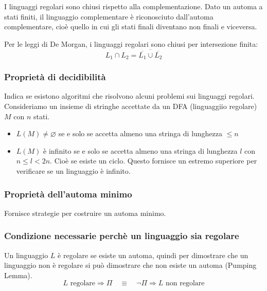\documentclass[a4paper]{article}
\begin{document}
\begin{theorem}
  I linguaggi regolari sono chiusi rispetto alla complementazione. Dato un automa
  a stati finiti, il linguaggio complementare è riconosciuto dall'automa complementare,
  cioè quello in cui gli stati finali diventano non finali e viceversa.

  \vspace{1em}
  \noindent
  Per le leggi di De Morgan, i linguaggi regolari sono chiusi per intersezione finita:
  \[
    L_1 \cap L_2 = \overline{\overline{L_1} \cup \overline{L_2}}
  \] 
\end{theorem}


\subsubsection{Proprietà di decidibilità}
Indica se esistono algoritmi che risolvono alcuni problemi sui linguaggi regolari.
Consideriamo un insieme di stringhe accettate da un DFA (linguaggiio regolare) \( M \) 
con \( n \) stati.
\begin{itemize}
  \item \( L(M) \neq \varnothing \) se e solo se accetta almeno una stringa di lunghezza \( \le n \) 

  \item \( L(M) \) è infinito se e solo se accetta almeno una stringa di lunghezza
    \( l \) con \( n \le l < 2n \). Cioè se esiste un ciclo. Questo fornisce un estremo
    superiore per verificare se un linguaggio è infinito.
\end{itemize}


\subsubsection{Proprietà dell'automa minimo}
Fornisce strategie per costruire un automa minimo.

\subsubsection{Condizione necessarie perchè un linguaggio sia regolare}
Un linguaggio \( L \) è regolare se esiste un automa, quindi per dimostrare che
un linguaggio non è regolare si può dimostrare che non esiste un automa (Pumping Lemma).
\[
  L \text{ regolare} \Rightarrow \Pi \quad \equiv \quad \neg \Pi \Rightarrow L \text{ non regolare}
\] 
\end{document}
